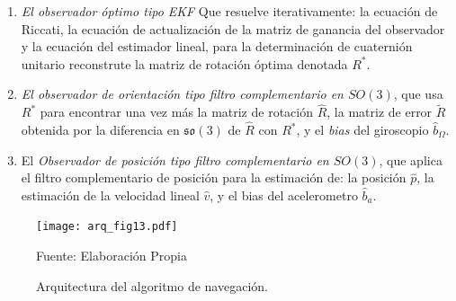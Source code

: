 \documentclass[10pt]{report}
\numberwithin{equation}{chapter}
\numberwithin{algorithm}{chapter}
\begin{document}
\begin{enumerate}
\item \emph{El observador óptimo tipo EKF}  Que resuelve iterativamente: la ecuación de Riccati, la ecuación de actualización de la matriz de ganancia del observador y la ecuación del estimador lineal, para la determinación de cuaternión unitario reconstrute la matriz de rotación óptima denotada $R^*$.
\item \emph{El observador de orientación tipo filtro complementario en $SO(3)$}, que usa $R^*$ para encontrar una vez más la matriz de rotación $\hat{R}$, la matriz de error $\tilde{R}$ obtenida por la diferencia en $\mathfrak{so}(3)$ de $\hat{R}$ con ${R}^*$, y el \emph{bias} del giroscopio $\hat{b}_\Omega$.
\item El \emph{Observador de posición tipo filtro complementario en $SO(3)$}, que aplica el filtro complementario de posición para la estimación de: la posición $\hat{p}$, la estimación de la velocidad lineal $\hat{v}$, y el bias del acelerometro $\hat{b}_a$.
\end{enumerate} 
\begin{figure}[t]
\centering
\texttt{[image: arq\_fig13.pdf]}
\caption{Arquitectura del algoritmo de navegación.}\scriptsize{Fuente: Elaboración Propia}
\label{arc_fig3}
\end{figure} 
\end{document}
